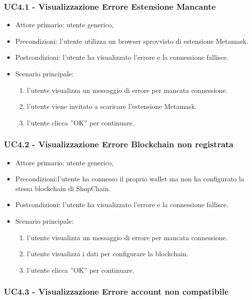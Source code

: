 \subsubsection{UC4.1 - Visualizzazione Errore Estensione Mancante}

\begin{itemize}
    \item Attore primario: utente generico,
    \item Precondizioni: l'utente utilizza un browser sprovvisto di estensione Metamask.
    \item Postcondizioni: l'utente ha visualizzato l'errore e la connessione fallisce.
    \item Scenario principale: \begin{enumerate}
        \item l'utente visualizza un messaggio di errore per mancata connessione.
        \item l'utente viene invitato a scaricare l'estensione Metamask.
        \item l’utente clicca ”OK” per continuare.
    \end{enumerate}
\end{itemize}

\subsubsection{UC4.2 - Visualizzazione Errore Blockchain non registrata}

\begin{itemize}
    \item Attore primario: utente generico,
    \item Precondizioni:l'utente ha connesso il proprio wallet ma non ha configurato la stessa blockchain di ShopChain.
    \item Postcondizioni: l'utente ha visualizzato l'errore e la connessione fallisce.
    \item Scenario principale: \begin{enumerate}
        \item l'utente visualizza un messaggio di errore per mancata connessione.
        \item l'utente visualizza i dati per configurare la blockchain.
        \item l’utente clicca ”OK” per continuare.
    \end{enumerate}
\end{itemize}

\subsubsection{UC4.3 - Visualizzazione Errore account non compatibile}

